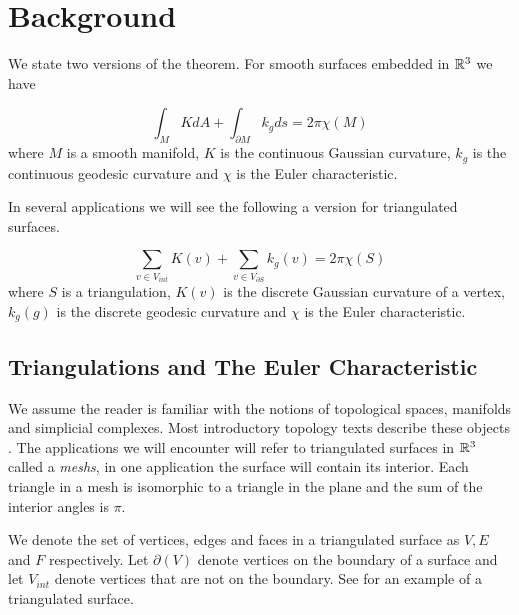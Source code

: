 \section{Background}\label{sec:background}
\label{sec:cast}

We state two versions of the theorem.
For smooth surfaces embedded in $\mathbb{R}^3$
we have


\begin{theorem} \label{thm:g-b-c}

$$\int_{M} K dA+ \int_{\partial M} k_g ds = 2\pi \chi(M)$$
where $M$ is a smooth manifold, $K$ is the continuous Gaussian curvature,
 $k_g$ is the continuous geodesic curvature and
$\chi$ is the Euler characteristic.
\end{theorem}

In several applications we will see
the following a version for triangulated surfaces.

\begin{theorem} \label{thm:g-b-d}

$$\sum_{v\in V_{int}} K(v) + \sum_{v\in V_{\partial S}} k_g(v) = 2\pi \chi(S)$$
where $S$ is a triangulation, $K(v)$ is the discrete Gaussian curvature
of a vertex, $k_g(g)$ is the discrete geodesic curvature and
$\chi$ is the Euler characteristic.
\end{theorem}







\subsection{Triangulations and The Euler Characteristic}

We assume the reader is familiar with the notions
of topological spaces, manifolds and simplicial complexes.
Most introductory topology texts describe these objects \cite{jm08,munkres}.
The applications we will encounter will refer to triangulated surfaces in $\mathbb{R}^3$
called a \emph{meshs}, in one application the surface will contain its interior.
Each triangle in a mesh is isomorphic to a triangle in the plane and the sum
of the interior angles is $\pi$.


We denote the set of vertices, edges and faces in a triangulated surface as 
$V, E$ and $F$ respectively.
Let $\partial(V)$ denote vertices on the boundary of a surface and let $V_{int}$ 
denote vertices that are not on the boundary.
See  for an example of a triangulated surface.



